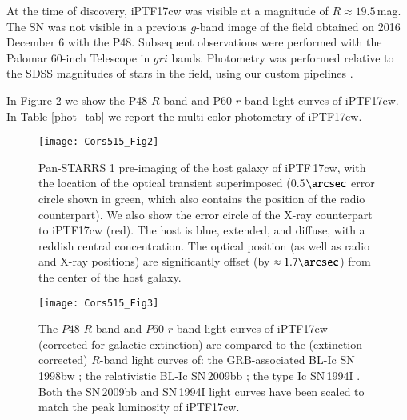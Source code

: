 \documentclass[twocolumn]{emulateapj}
\begin{document}
At the time of discovery, iPTF17cw was visible at a magnitude of $R\approx 19.5$\,mag. The SN was not visible in a previous $g$-band image of the field obtained on 2016 December 6 with the P48. Subsequent observations were performed with the Palomar 60-inch Telescope \citep[P60; ][]{Cenko2006} in $gri$ bands. Photometry was  performed  relative  to  the  SDSS magnitudes of stars in the field, using our custom pipelines \citep{Ofek2012,Fremling2016}. 

In Figure \ref{fig:phot} we show the P48 $R$-band and P60 $r$-band light curves of iPTF17cw. In Table \ref{phot_tab} we report the multi-color photometry of iPTF17cw.

\begin{figure}
\begin{center}
\texttt{[image: Cors515\_Fig2]}
\vspace{-0.1cm}
\caption{Pan-STARRS 1 \citep{Kaiser2010,PS1} pre-imaging of the host galaxy of iPTF\,17cw, with the
location of the optical transient superimposed (0.5$\arcsec$ error circle shown in green, which also contains the position of the radio counterpart).  We also show the error circle of the X-ray counterpart to iPTF17cw (red). The host is blue, extended, and diffuse, with a
reddish central concentration.  The optical position (as well as radio and X-ray positions) are significantly offset (by $\approx 1.7\arcsec$) from the center of the host galaxy. \label{fig:host}}
\end{center}
\end{figure}

\begin{figure}
\hspace{-0.5cm}
\texttt{[image: Cors515\_Fig3]}
\vspace{-0.35cm}
\caption{The $P48$ $R$-band and $P60$ $r$-band light curves of iPTF17cw (corrected for galactic extinction) are compared to the (extinction-corrected) $R$-band light curves of: the GRB-associated BL-Ic SN\,1998bw \citep[solid;][]{Clocchiatti2011}; the relativistic BL-Ic SN\,2009bb \citep[dash-dotted;][]{Pignata2011}; the type Ic SN\,1994I \citep[dashed;][]{Richmond1996}. Both the SN\,2009bb and SN\,1994I light curves have been scaled to match the peak luminosity of iPTF17cw. \\\label{fig:phot}}
\end{figure}
\end{document}
